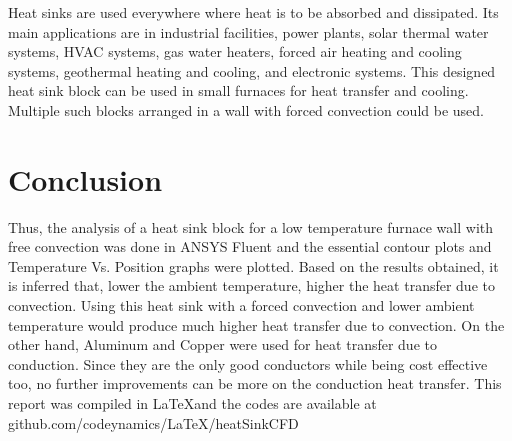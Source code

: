 \documentclass[twoside]{article}
\begin{document}
Heat sinks are used everywhere where heat is to be absorbed and dissipated. Its main applications are in industrial facilities, power plants, solar thermal water systems, HVAC systems, gas water heaters, forced air heating and cooling systems, geothermal heating and cooling, and electronic systems. This designed heat sink block can be used in small furnaces for heat transfer and cooling. Multiple such blocks arranged in a wall with forced convection could be used.
\section{Conclusion}
Thus, the analysis of a heat sink block for a low temperature furnace wall with free convection was done in ANSYS Fluent and the essential contour plots and Temperature Vs. Position graphs were plotted. Based on the results obtained, it is inferred that, lower the ambient temperature, higher the heat transfer due to convection. Using this heat sink with a forced convection and lower ambient temperature would produce much higher heat transfer due to convection. On the other hand, Aluminum and Copper were used for heat transfer due to conduction. Since they are the only good conductors while being cost effective too, no further improvements can be more on the conduction heat transfer. 
This report was compiled in \LaTeX and the codes are available at github.com/codeynamics/LaTeX/heatSinkCFD
\end{document}
